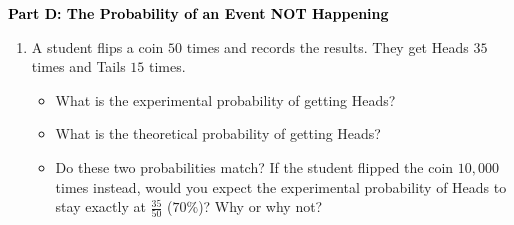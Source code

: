 \documentclass[12pt, letterpaper, fleqn]{article}
\newcommand{\blank}{\underline{\hspace{2.2cm}}}
\begin{document}
\newpage

\begin{tcolorbox}[colback=customteal!20]
\large\textcolor{black}{\textbf{Part D: The Probability of an Event NOT Happening}}
\end{tcolorbox}

\vspace{3mm}

\begin{enumerate}[itemsep=4.2cm, leftmargin=0.6cm, resume]
\item A student flips a coin $50$ times and records the results. They get Heads $35$ times and Tails $15$ times.
\begin{itemize}
\item What is the experimental probability of getting Heads? \blank
\item What is the theoretical probability of getting Heads? \blank
\item Do these two probabilities match? If the student flipped the coin $10,000$ times instead, would you expect the experimental probability of Heads to stay exactly at $\frac{35}{50}$ ($70\%$)? Why or why not?
\end{itemize}
\end{enumerate}
\end{document}
